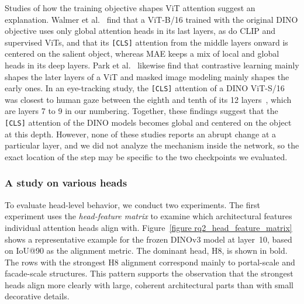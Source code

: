 \documentclass[lineno,pdflatex,sn-mathphys-num]{sn-jnl}%
\theoremstyle{thmstyleone}%
\theoremstyle{thmstyletwo}%
\theoremstyle{thmstylethree}%
\begin{document}
Studies of how the training objective shapes ViT attention suggest an explanation. Walmer et al.~\cite{Walmer23CVPR} find that a ViT-B/16 trained with the original DINO objective uses only global attention heads in its last layers, as do CLIP and supervised ViTs, and that its \texttt{[CLS]} attention from the middle layers onward is centered on the salient object, whereas MAE keeps a mix of local and global heads in its deep layers. Park et al.~\cite{park2023what} likewise find that contrastive learning mainly shapes the later layers of a ViT and masked image modeling mainly shapes the early ones. In an eye-tracking study, the \texttt{[CLS]} attention of a DINO ViT-S/16 was closest to human gaze between the eighth and tenth of its 12 layers~\cite{Yamamoto2025}, which are layers 7 to 9 in our numbering. Together, these findings suggest that the \texttt{[CLS]} attention of the DINO models becomes global and centered on the object at this depth. However, none of these studies reports an abrupt change at a particular layer, and we did not analyze the mechanism inside the network, so the exact location of the step may be specific to the two checkpoints we evaluated.

\subsubsection{A study on various heads}

To evaluate head-level behavior, we conduct two experiments. The first experiment uses the \textit{head-feature matrix} to examine which architectural features individual attention heads align with. Figure~\ref{figure rq2_head_feature_matrix} shows a representative example for the frozen DINOv3 model at layer~10, based on IoU@90 as the alignment metric. The dominant head, H8, is shown in bold. The rows with the strongest H8 alignment correspond mainly to portal-scale and facade-scale structures. This pattern supports the observation that the strongest heads align more clearly with large, coherent architectural parts than with small decorative details.
\end{document}
